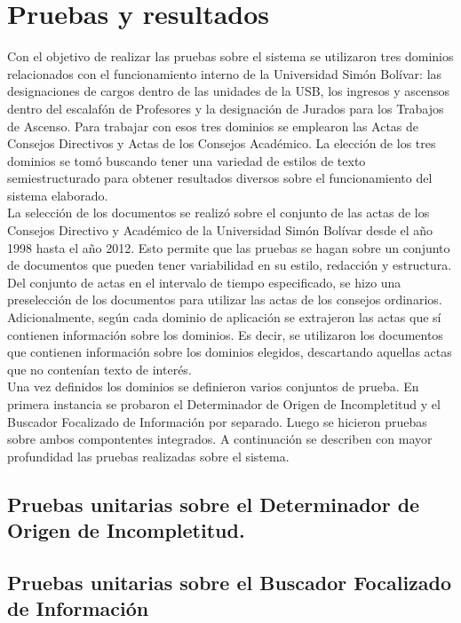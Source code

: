 \chapter{Pruebas y resultados} \label{chap:pruebas}

Con el objetivo de realizar las pruebas sobre el sistema se utilizaron tres dominios relacionados con el funcionamiento interno de la Universidad Simón Bolívar: las designaciones de cargos dentro de las unidades de la USB, los ingresos y ascensos dentro del escalafón de Profesores y la designación de Jurados para los Trabajos de Ascenso. Para trabajar con esos tres dominios se emplearon las Actas de Consejos Directivos y Actas de los Consejos Académico. La elección de los tres dominios se tomó buscando tener una variedad de estilos de texto semiestructurado para obtener resultados diversos sobre el funcionamiento del sistema elaborado. \\

La selección de los documentos se realizó sobre el conjunto de las actas de los Consejos Directivo y Académico de la Universidad Simón Bolívar desde el año 1998 hasta el año 2012. Esto permite que las pruebas se hagan sobre un conjunto de documentos que pueden tener variabilidad en su estilo, redacción y estructura. Del conjunto de actas en el intervalo de tiempo especificado, se hizo una preselección de los documentos para utilizar las actas de los consejos ordinarios. Adicionalmente, según cada dominio de aplicación se extrajeron las actas que sí contienen información sobre los dominios. Es decir, se utilizaron los documentos que contienen información sobre los dominios elegidos, descartando aquellas actas que no contenían texto de interés.\\

Una vez definidos los dominios se definieron varios conjuntos de prueba. En primera instancia se probaron el Determinador de Origen de Incompletitud y el Buscador Focalizado de Información por separado. Luego se hicieron pruebas sobre ambos compontentes integrados. A continuación se describen con mayor profundidad las pruebas realizadas sobre el sistema. \\

\section{Pruebas unitarias sobre el Determinador de Origen de Incompletitud.} 

\section{Pruebas unitarias sobre el Buscador Focalizado de Información}


